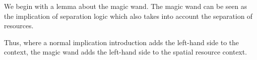 \documentclass[thesis.tex]{subfiles}
\begin{document}
We begin with a lemma about the magic wand. The magic wand can be seen as the implication of separation logic which also takes into account the separation of resources.

\begin{minipage}{0.4\textwidth}
    \begin{prooftree}
    \end{prooftree}
\end{minipage}
%
\begin{minipage}{0.4\textwidth}
    \begin{prooftree}
    \end{prooftree}
\end{minipage}

Thus, where a normal implication introduction adds the left-hand side to the \coq context, the magic wand adds the left-hand side to the spatial resource context.
\end{document}
